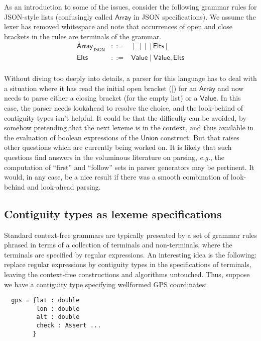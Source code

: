 \documentclass{article}
\newcommand{\eg}{\textit{e.g.}}
\newcommand{\konst}[1]{\ensuremath{\mathsf{#1}}}
\theoremstyle{definition}
\begin{document}
As an introduction to some of the issues, consider the following
grammar rules for JSON-style lists (confusingly called \konst{Array}
in JSON specifications). We assume the lexer has removed whitespace
and note that occurrences of open and close brackets in the rules are
terminals of the grammar.
\[
\begin{array}{rcl}
 \konst{Array}_{\konst{JSON}} & ::= & [\; ] \mid [ \konst{Elts} ] \\
 \konst{Elts}  & ::= & \konst{Value} \mid \konst{Value} ,  \konst{Elts} \\
\end{array}
\]

Without diving too deeply into details, a parser for this language has
to deal with a situation where it has read the initial open bracket
([) for an \konst{Array} and now needs to parse either a closing
  bracket (for the empty list) or a \konst{Value}. In this case, the
  parser needs lookahead to resolve the choice, and the look-behind of
  contiguity types isn't helpful. It could be that the difficulty can
  be avoided, by somehow pretending that the next lexeme is in the
  context, and thus available in the evaluation of boolean expressions
  of the \konst{Union} construct. But that raises other questions
  which are currently being worked on. It is likely that such
  questions find answers in the voluminous literature on parsing, \eg,
  the computation of ``first'' and ``follow'' sets in parser
  generators may be pertinent. It would, in any case, be a nice result
  if there was a smooth combination of look-behind and look-ahead
  parsing.

\subsection{Contiguity types as lexeme specifications}

Standard context-free grammars are typically presented by a set of
grammar rules phrased in terms of a collection of terminals and
non-terminals, where the terminals are specified by regular
expressions. An interesting idea is the following: replace regular
expressions by contiguity types in the specifications of terminals,
leaving the context-free constructions and algorithms untouched. Thus,
suppose we have a contiguity type specifying wellformed GPS
coordinates:

{\small
\begin{verbatim}
  gps = {lat : double
         lon : double
         alt : double
         check : Assert ...
        }
\end{verbatim}}
\end{document}
